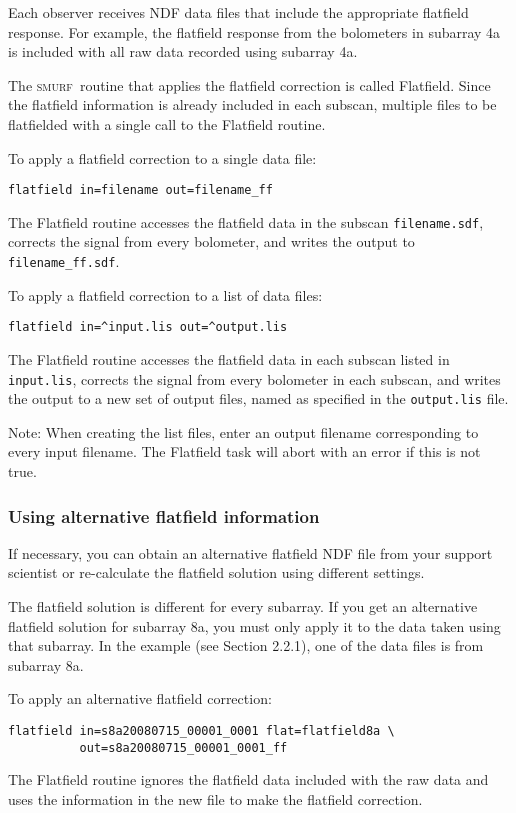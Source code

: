 \documentclass[twoside,11pt]{article}
\renewcommand{\_}{\texttt{\symbol{95}}}
\newcommand{\SMURF}{\textsc{smurf}}
\begin{document}
Each observer receives NDF data files that include the appropriate
flatfield response. For example, the flatfield response from the
bolometers in subarray 4a is included with all raw data recorded using
subarray 4a.

The \SMURF\ routine that applies the flatfield correction is called
Flatfield. Since the flatfield information is already included in each
subscan, multiple files to be flatfielded with a single call to the
Flatfield routine.

To apply a flatfield correction to a single data file:
\begin{verbatim}
flatfield in=filename out=filename_ff
\end{verbatim}
The Flatfield routine accesses the flatfield data in the subscan
\verb+filename.sdf+, corrects the signal from every bolometer, and
writes the output to \verb+filename_ff.sdf+.

To apply a flatfield correction to a list of data files:
\begin{verbatim}
flatfield in=^input.lis out=^output.lis
\end{verbatim}
The Flatfield routine accesses the flatfield data in each subscan
listed in \verb+input.lis+, corrects the signal from every bolometer
in each subscan, and writes the output to a new set of output files,
named as specified in the \verb+output.lis+ file.

Note: When creating the list files, enter an output filename
corresponding to every input filename. The Flatfield task will abort
with an error if this is not true.

\subsubsection{Using alternative flatfield information}

If necessary, you can obtain an alternative flatfield NDF file from
your support scientist or re-calculate the flatfield solution using
different settings.

The flatfield solution is different for every subarray. If you get an
alternative flatfield solution for subarray 8a, you must only apply it
to the data taken using that subarray. In the example (see Section
2.2.1), one of the data files is from subarray 8a.

To apply an alternative flatfield correction:
\begin{verbatim}
flatfield in=s8a20080715_00001_0001 flat=flatfield8a \
          out=s8a20080715_00001_0001_ff
\end{verbatim}
The Flatfield routine ignores the flatfield data included with the raw
data and uses the information in the new file to make the flatfield
correction.
\end{document}
